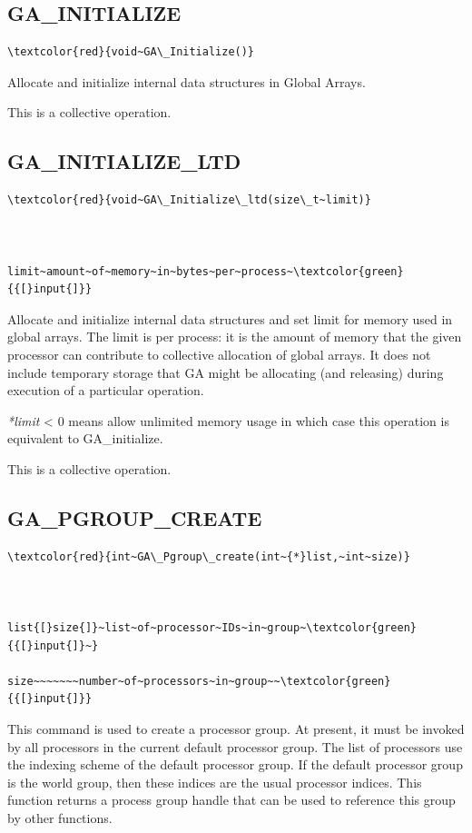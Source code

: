 
\subsection*{\label{sub:GA_INITIALIZE}GA\_INITIALIZE}
\begin{verbatim}
\textcolor{red}{void~GA\_Initialize()}
\end{verbatim}
Allocate and initialize internal data structures in Global Arrays.

This is a collective operation. 


\subsection*{\label{sub:GA_INITIALIZE_LTD}GA\_INITIALIZE\_LTD}
\begin{verbatim}
\textcolor{red}{void~GA\_Initialize\_ltd(size\_t~limit)}



limit~amount~of~memory~in~bytes~per~process~\textcolor{green}{{[}input{]}}
\end{verbatim}
Allocate and initialize internal data structures and set limit for
memory used in global arrays. The limit is per process: it is the
amount of memory that the given processor can contribute to collective
allocation of global arrays. It does not include temporary storage
that GA might be allocating (and releasing) during execution of a
particular operation.

\emph{{*}limit }< 0 means \textquotedbl{}allow unlimited memory usage\textquotedbl{}
in which case this operation is equivalent to GA\_initialize.

This is a collective operation. 


\subsection*{\label{sub:GA_PGROUP_CREATE}GA\_PGROUP\_CREATE}
\begin{verbatim}
\textcolor{red}{int~GA\_Pgroup\_create(int~{*}list,~int~size)}



list{[}size{]}~list~of~processor~IDs~in~group~\textcolor{green}{{[}input{]}~}

size~~~~~~~number~of~processors~in~group~~\textcolor{green}{{[}input{]}}
\end{verbatim}
This command is used to create a processor group. At present, it must
be invoked by all processors in the current default processor group.
The list of processors use the indexing scheme of the default processor
group. If the default processor group is the world group, then these
indices are the usual processor indices. This function returns a process
group handle that can be used to reference this group by other functions.

